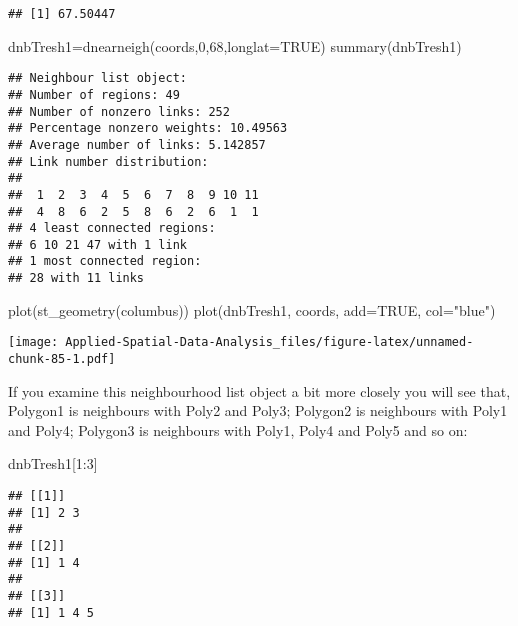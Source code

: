 \documentclass[
]{book}
\newenvironment{Shaded}{\begin{snugshade}}{\end{snugshade}}
\newcommand{\AttributeTok}[1]{\textcolor[rgb]{0.77,0.63,0.00}{#1}}
\newcommand{\ConstantTok}[1]{\textcolor[rgb]{0.00,0.00,0.00}{#1}}
\newcommand{\DecValTok}[1]{\textcolor[rgb]{0.00,0.00,0.81}{#1}}
\newcommand{\FunctionTok}[1]{\textcolor[rgb]{0.00,0.00,0.00}{#1}}
\newcommand{\NormalTok}[1]{#1}
\newcommand{\OtherTok}[1]{\textcolor[rgb]{0.56,0.35,0.01}{#1}}
\newcommand{\SpecialCharTok}[1]{\textcolor[rgb]{0.00,0.00,0.00}{#1}}
\newcommand{\StringTok}[1]{\textcolor[rgb]{0.31,0.60,0.02}{#1}}
\begin{document}
\begin{verbatim}
## [1] 67.50447
\end{verbatim}

\begin{Shaded}
\begin{Highlighting}[]
\NormalTok{dnbTresh1}\OtherTok{=}\FunctionTok{dnearneigh}\NormalTok{(coords,}\DecValTok{0}\NormalTok{,}\DecValTok{68}\NormalTok{,}\AttributeTok{longlat=}\ConstantTok{TRUE}\NormalTok{)}
\FunctionTok{summary}\NormalTok{(dnbTresh1)}
\end{Highlighting}
\end{Shaded}

\begin{verbatim}
## Neighbour list object:
## Number of regions: 49 
## Number of nonzero links: 252 
## Percentage nonzero weights: 10.49563 
## Average number of links: 5.142857 
## Link number distribution:
## 
##  1  2  3  4  5  6  7  8  9 10 11 
##  4  8  6  2  5  8  6  2  6  1  1 
## 4 least connected regions:
## 6 10 21 47 with 1 link
## 1 most connected region:
## 28 with 11 links
\end{verbatim}

\begin{Shaded}
\begin{Highlighting}[]
\FunctionTok{plot}\NormalTok{(}\FunctionTok{st\_geometry}\NormalTok{(columbus))}
\FunctionTok{plot}\NormalTok{(dnbTresh1, coords, }\AttributeTok{add=}\ConstantTok{TRUE}\NormalTok{, }\AttributeTok{col=}\StringTok{"blue"}\NormalTok{)}
\end{Highlighting}
\end{Shaded}

\texttt{[image: Applied-Spatial-Data-Analysis\_files/figure-latex/unnamed-chunk-85-1.pdf]}

If you examine this neighbourhood list object a bit more closely you will see that, Polygon1 is neighbours with Poly2 and Poly3; Polygon2 is neighbours with Poly1 and Poly4; Polygon3 is neighbours with Poly1, Poly4 and Poly5 and so on:

\begin{Shaded}
\begin{Highlighting}[]
\NormalTok{dnbTresh1[}\DecValTok{1}\SpecialCharTok{:}\DecValTok{3}\NormalTok{]}
\end{Highlighting}
\end{Shaded}

\begin{verbatim}
## [[1]]
## [1] 2 3
## 
## [[2]]
## [1] 1 4
## 
## [[3]]
## [1] 1 4 5
\end{verbatim}
\end{document}
